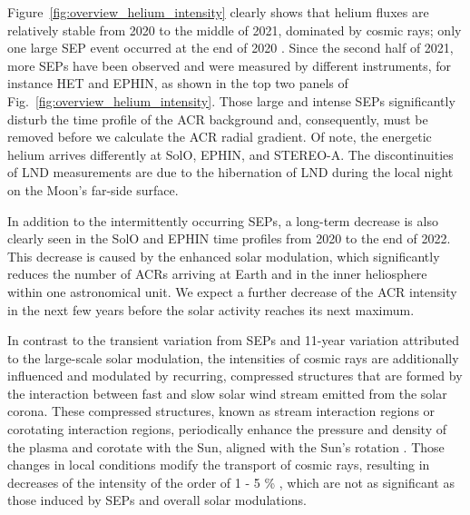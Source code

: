 Figure~\ref{fig:overview_helium_intensity} clearly shows that helium fluxes are relatively stable from 2020 to the middle of 2021, dominated by cosmic rays; only one large \ac{SEP} event occurred at the end of 2020 \citep{Kolhoff2021AA}. 
Since the second half of 2021, more \acp{SEP} have been observed and were measured by different instruments, for instance \ac{HET} and \ac{EPHIN}, as shown in the top two panels of Fig.~\ref{fig:overview_helium_intensity}.
Those large and intense \acp{SEP} significantly disturb the time profile of the \ac{ACR} background and, consequently, must be removed before we calculate the \ac{ACR} radial gradient. 
Of note, the energetic helium arrives differently at \ac{SolO}, \ac{EPHIN}, and \ac{STEREO}-A. The discontinuities of \ac{LND} measurements are due to the hibernation of \ac{LND} during the local night on the Moon's far-side surface.


In addition to the intermittently occurring \acp{SEP}, a long-term decrease is also clearly seen in the \ac{SolO} and \ac{EPHIN} time profiles from 2020 to the end of 2022. This decrease is caused by the enhanced solar modulation, which significantly reduces the number of \acp{ACR} arriving at Earth and in the inner heliosphere within one astronomical unit. We expect a further decrease of the \ac{ACR} intensity in the next few years before the solar activity reaches its next maximum.

In contrast to the transient variation from \acp{SEP} and 11-year variation attributed to the large-scale solar modulation, the intensities of cosmic rays are additionally influenced and modulated by recurring, compressed structures that are formed by the interaction between fast and slow solar wind stream emitted from the solar corona. These compressed structures, known as stream interaction regions or corotating interaction regions, periodically enhance the pressure and density of the plasma and corotate with the Sun, aligned with the Sun's rotation \citep{Burlaga1974JGR, Gosling1976JGR, Richardson2004SSRv}. Those changes in local conditions modify the transport of cosmic rays, resulting in decreases of the intensity of the order of 1 - 5 \% \citep{Richardson2004SSRv, Richardson-2018}, which are not as significant as those induced by \acp{SEP} and overall solar modulations.

